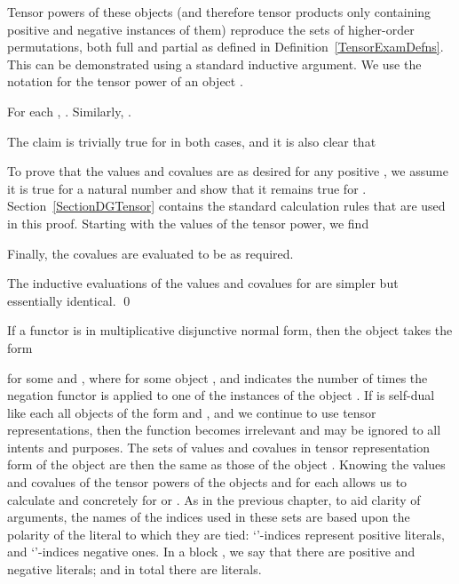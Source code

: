 \documentclass{LMCS}
\theoremstyle{plain}\newtheorem*{cLm}{Claim}
\newcommand{\p}{} \newcommand{\N}{\mathbb{N}}
\newcommand{\hughg}[1]{#1}
\begin{document}
\p Tensor powers of these objects (and therefore tensor products only containing positive and negative instances of them) reproduce the sets of higher-order permutations, both full and partial as defined in Definition~\ref{TensorExamDefns}. This can be demonstrated using a standard inductive argument. We use the notation  for the  tensor power of an object .

\begin{lem} \label{ClaimTensorPowers}
For each , . Similarly, .
\end{lem}
\proof
The claim is trivially true for  in both cases, and it is also clear that


\noindent To prove that the values and covalues are as desired for any positive , we assume it is true for a natural number  and show that it remains true for . \hughg{Section~\ref{SectionDGTensor} contains the standard calculation rules that are used in this proof.} Starting with the values of the tensor power, we find


\noindent Finally, the covalues are evaluated to be as required.


The inductive evaluations of the values and covalues for  are simpler but essentially identical. \qed

If a functor  is in multiplicative disjunctive normal form, then the object  takes the form
\vspace{1mm}

\smallskip

\noindent for some  and , where  for some object , and  indicates the number of times the negation functor is applied to one of the instances of the object . If  is self-dual like each all objects of the form  and , and we continue to use tensor representations, then the function  becomes irrelevant and may be ignored to all intents and purposes. The sets of values and covalues in tensor representation form of the object  are then the same as those of the object . Knowing the values and covalues of the tensor powers of the objects  and  for each  allows us to calculate  and  concretely for  or . As in the previous chapter, to aid clarity of arguments, the names of the indices used in these sets are based upon the polarity of the literal to which they are tied: `'-indices represent positive literals, and `'-indices negative ones. In a block , we say that there are  positive and  negative literals; and in total there are  literals.



\hughg{}
\end{document}
